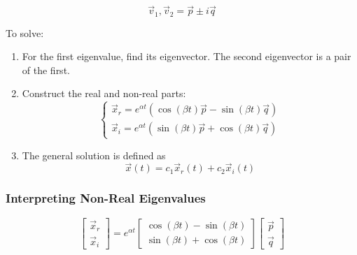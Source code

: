         \[
            \vec{v}_1, \vec{v}_2 = \vec{p} \pm i \vec{q}
        \]

    To solve:

        \begin{enumerate}
            \item For the first eigenvalue, find its eigenvector. The second eigenvector is a pair of the first.
            \item Construct the real and non-real parts:
                \[
                    \begin{cases}
                        \vec{x}_r = e^{\alpha t} ( \cos(\beta t) \vec{p} - \sin(\beta t)\vec{q})\\
                        \vec{x}_i = e^{\alpha t} ( \sin(\beta t) \vec{p} + \cos(\beta t)\vec{q})
                    \end{cases}
                \]
            \item The general solution is defined as
                \[
                    \vec{x}(t) = c_1 \vec{x}_r(t) + c_2 \vec{x}_i(t)
                \]
        \end{enumerate}

        \subsubsection{Interpreting Non-Real Eigenvalues}
        \[
            \left[ \begin{array}{c}
                \vec{x}_r\\
                \vec{x}_i
            \end{array} \right] = e^{\alpha t}
            \left[ \begin{array}{c}
                \cos(\beta t) - \sin(\beta t)\\
                \sin(\beta t) + \cos(\beta t)
            \end{array} \right]
            \left[ \begin{array}{c}
                \vec{p}\\
                \vec{q}
            \end{array} \right]
        \]

